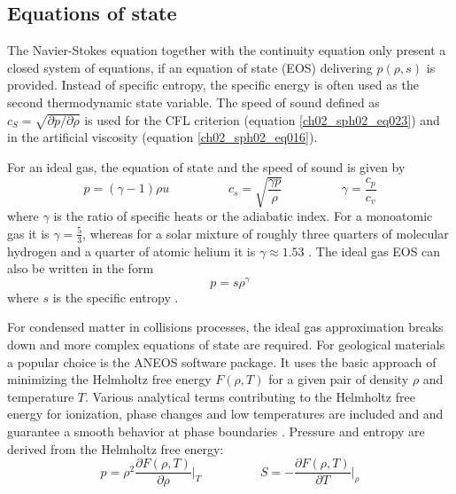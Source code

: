 \subsection{Equations of state}
The Navier-Stokes equation together with the continuity equation only present a closed system of equations, if an equation of state (EOS) delivering $p(\rho, s)$ is provided. Instead of specific entropy, the specific energy is often used as the second thermodynamic state variable. The speed of sound defined as $c_S = \sqrt{ \partial p / \partial \rho } $ is used for the CFL criterion (equation \ref{ch02_sph02_eq023}) and in the artificial viscosity (equation \ref{ch02_sph02_eq016}).

For an ideal gas, the equation of state and the speed of sound is given by
\begin{equation}
\label{ch02_sph01_eq036}
p = ( \gamma - 1 ) \rho u \hspace{2cm} c_s = \sqrt{ \frac{\gamma p}{\rho} } \hspace{2cm} \gamma = \frac{c_p}{c_v}
\end{equation}
where $\gamma$ is the ratio of specific heats or the adiabatic index. For a monoatomic gas it is $\gamma = \frac{5}{3}$, whereas for a solar mixture of roughly three quarters of molecular hydrogen and a quarter of atomic helium it is $\gamma \approx 1.53$ \citep{Nelson:2000p75}. The ideal gas EOS can also be written in the form 
\begin{equation}
p = s \rho^{\gamma}
\end{equation}
where $s$ is the specific entropy \citep{Springel:2005p51}.

For condensed matter in collisions processes, the ideal gas approximation breaks down and more complex equations of state are required. For geological materials a popular choice is the ANEOS software package. It uses the basic approach of minimizing the Helmholtz free energy $F(\rho, T)$ for a given pair of density $\rho$ and temperature $T$. Various analytical terms contributing to the Helmholtz free energy for ionization, phase changes and low temperatures are included and and guarantee a smooth behavior at phase boundaries \citep{Thompson:1990p1103}. Pressure and entropy are derived from the Helmholtz free energy:
\begin{equation}
\label{ch02_sph01_eq037}
p = \rho^2 \frac{\partial F(\rho, T)}{\partial \rho} \Big|_{T} \hspace{2cm} S = - \frac{\partial F(\rho, T)}{\partial T} \Big|_{\rho}
\end{equation}

